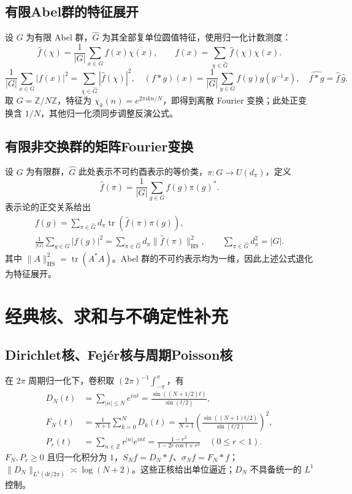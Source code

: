 \documentclass[../main.tex]{subfiles}
\begin{document}
\subsection{有限Abel群的特征展开}
设 $G$ 为有限 Abel 群，$\widehat G$ 为其全部复单位圆值特征，使用归一化计数测度：
\[
\widehat f(\chi)=\frac1{|G|}\sum_{x\in G}f(x)\overline{\chi(x)},\qquad
f(x)=\sum_{\chi\in\widehat G}\widehat f(\chi)\chi(x).
\]
\[
\frac1{|G|}\sum_{x\in G}|f(x)|^2=\sum_{\chi\in\widehat G}|\widehat f(\chi)|^2,
\quad (f*g)(x)=\frac1{|G|}\sum_{y\in G}f(y)g(y^{-1}x),\quad
\widehat{f*g}=\widehat f\,\widehat g.
\]
取 $G=\mathbb Z/N\mathbb Z$，特征为 $\chi_k(n)=e^{2\pi ikn/N}$，即得到离散 Fourier 变换；此处正变换含 $1/N$，其他归一化须同步调整反演公式。
\par\begin{samepage}
\subsection{有限非交换群的矩阵Fourier变换}
设 $G$ 为有限群，$\widehat G$ 此处表示不可约酉表示的等价类，$\pi:G\to U(d_\pi)$，定义
\[
\widehat f(\pi)=\frac1{|G|}\sum_{g\in G}f(g)\pi(g)^*.
\]
表示论的正交关系给出
\begin{gather*}
f(g)=\sum_{\pi\in\widehat G}d_\pi\operatorname{tr}(\widehat f(\pi)\pi(g)),\\
\frac1{|G|}\sum_{g\in G}|f(g)|^2
=\sum_{\pi\in\widehat G}d_\pi\|\widehat f(\pi)\|_{\mathrm{HS}}^2,
\qquad\sum_{\pi\in\widehat G}d_\pi^2=|G|.
\end{gather*}
其中 $\|A\|_{\mathrm{HS}}^2=\operatorname{tr}(A^*A)$。Abel 群的不可约表示均为一维，因此上述公式退化为特征展开。
\par\end{samepage}
\section{经典核、求和与不确定性补充}
\subsection{Dirichlet核、Fejér核与周期Poisson核}
在 $2\pi$ 周期归一化下，卷积取 $(2\pi)^{-1}\int_{-\pi}^\pi$，有
\begin{align*}
D_N(t)&=\sum_{|n|\le N}e^{int}=\frac{\sin((N+1/2)t)}{\sin(t/2)},\\
F_N(t)&=\frac1{N+1}\sum_{k=0}^ND_k(t)
=\frac1{N+1}\left(\frac{\sin((N+1)t/2)}{\sin(t/2)}\right)^2,\\
P_r(t)&=\sum_{n\in\mathbb Z}r^{|n|}e^{int}
=\frac{1-r^2}{1-2r\cos t+r^2}\quad(0\le r<1).
\end{align*}
$F_N,P_r\ge0$ 且归一化积分为 $1$，$S_Nf=D_N*f$、$\sigma_Nf=F_N*f$；$\|D_N\|_{L^1(\mathrm dt/2\pi)}\asymp\log(N+2)$。这些正核给出单位逼近；$D_N$ 不具备统一的 $L^1$ 控制。
\end{document}
